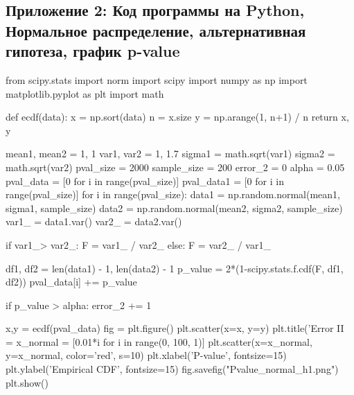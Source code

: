 \documentclass[12pt]{disser}
\begin{document}
\subsection*{Приложение 2: Код программы на Python, Нормальное распределение, альтернативная гипотеза, график p-value}
\begin{python}
from scipy.stats import norm
import scipy
import numpy as np
import matplotlib.pyplot as plt
import math

def ecdf(data):
    x = np.sort(data)
    n = x.size
    y = np.arange(1, n+1) / n
    return x, y


mean1, mean2 = 1, 1
var1, var2 = 1, 1.7
sigma1 = math.sqrt(var1)
sigma2 = math.sqrt(var2)
pval_size = 2000
sample_size = 200
error_2 = 0
alpha = 0.05
pval_data = [0 for i in range(pval_size)]
pval_data1 = [0 for i in range(pval_size)]
for i in range(pval_size):
    data1 = np.random.normal(mean1, sigma1, sample_size)
    data2 = np.random.normal(mean2, sigma2, sample_size)
    var1_ = data1.var()
    var2_ = data2.var()

    if var1_> var2_:
        F = var1_ / var2_
    else:
        F = var2_ / var1_

    df1, df2 = len(data1) - 1, len(data2) - 1
    p_value = 2*(1-scipy.stats.f.cdf(F, df1, df2))
    pval_data[i] += p_value

    if p_value > alpha:
        error_2 += 1

x,y = ecdf(pval_data)
fig = plt.figure()
plt.scatter(x=x, y=y)
plt.title('Error II = %
x_normal = [0.01*i for i in range(0, 100, 1)]
plt.scatter(x=x_normal, y=x_normal, color='red', s=10)
plt.xlabel('P-value', fontsize=15)
plt.ylabel('Empirical CDF', fontsize=15)
fig.savefig("Pvalue_normal_h1.png")
plt.show()
\end{python}
\end{document}
